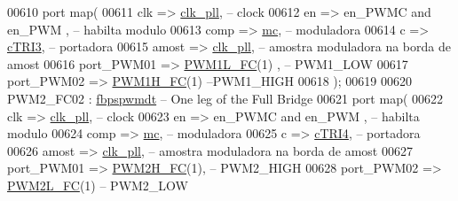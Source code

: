\begin{DoxyCode}
00610     \textcolor{keywordflow}{port} \textcolor{keywordflow}{map}( 
00611          clk => \hyperlink{class_d_e0___n_a_n_o___v_f_1_1_m_a_i_n_a1d63ebfc050c1099e1dff991817ec3b0}{clk\_pll},\textcolor{keyword}{ -- clock}
00612          en => en\_PWMC \textcolor{keywordflow}{and} en\_PWM  ,\textcolor{keyword}{ -- habilta modulo}
00613          comp  => \hyperlink{class_d_e0___n_a_n_o___v_f_1_1_m_a_i_n_add77a3ba2fff852407a90f156620722c}{mc},\textcolor{keyword}{ -- moduladora     }
00614          c => \hyperlink{class_d_e0___n_a_n_o___v_f_1_1_m_a_i_n_a5629e2e1f290ee8718490a7f096055fe}{cTRI3},\textcolor{keyword}{ -- portadora}
00615          amost => \hyperlink{class_d_e0___n_a_n_o___v_f_1_1_m_a_i_n_a1d63ebfc050c1099e1dff991817ec3b0}{clk\_pll},\textcolor{keyword}{ -- amostra moduladora na borda de amost}
00616          port\_PWM01  => \hyperlink{class_d_e0___n_a_n_o___v_f_ac9a5e24e4c9b96a7ee1750285ff2af08}{PWM1L\_FC}\textcolor{vhdlchar}{(}\textcolor{vhdllogic}{1}\textcolor{vhdlchar}{)} ,\textcolor{keyword}{ -- PWM1\_LOW}
00617          port\_PWM02 => \hyperlink{class_d_e0___n_a_n_o___v_f_ae64c7416adbe802e6aa4125230fad012}{PWM1H\_FC}\textcolor{vhdlchar}{(}\textcolor{vhdllogic}{1}\textcolor{vhdlchar}{)}\textcolor{keyword}{   --PWM1\_HIGH}
00618          \textcolor{vhdlchar}{)};  
00619         
00620 PWM2\_FC02 : \hyperlink{classfbpspwmdt}{fbpspwmdt} -- One leg \textcolor{keywordflow}{of} the Full Bridge
00621     \textcolor{keywordflow}{port} \textcolor{keywordflow}{map}( 
00622          clk => \hyperlink{class_d_e0___n_a_n_o___v_f_1_1_m_a_i_n_a1d63ebfc050c1099e1dff991817ec3b0}{clk\_pll},\textcolor{keyword}{ -- clock}
00623          en => en\_PWMC \textcolor{keywordflow}{and} en\_PWM  ,\textcolor{keyword}{ -- habilta modulo}
00624          comp  => \hyperlink{class_d_e0___n_a_n_o___v_f_1_1_m_a_i_n_add77a3ba2fff852407a90f156620722c}{mc},\textcolor{keyword}{ -- moduladora     }
00625          c => \hyperlink{class_d_e0___n_a_n_o___v_f_1_1_m_a_i_n_a569a3e9bfb8853bdf2c985d444cb4863}{cTRI4},\textcolor{keyword}{ -- portadora}
00626          amost => \hyperlink{class_d_e0___n_a_n_o___v_f_1_1_m_a_i_n_a1d63ebfc050c1099e1dff991817ec3b0}{clk\_pll},\textcolor{keyword}{ -- amostra moduladora na borda de amost}
00627          port\_PWM01  => \hyperlink{class_d_e0___n_a_n_o___v_f_a8318940c01015b267904bdca0e01c2a2}{PWM2H\_FC}\textcolor{vhdlchar}{(}\textcolor{vhdllogic}{1}\textcolor{vhdlchar}{)},\textcolor{keyword}{ -- PWM2\_HIGH}
00628          port\_PWM02 => \hyperlink{class_d_e0___n_a_n_o___v_f_a47c0de05323647e9484b2ec6764255c0}{PWM2L\_FC}\textcolor{vhdlchar}{(}\textcolor{vhdllogic}{1}\textcolor{vhdlchar}{)}\textcolor{keyword}{   -- PWM2\_LOW}

\end{DoxyCode}
